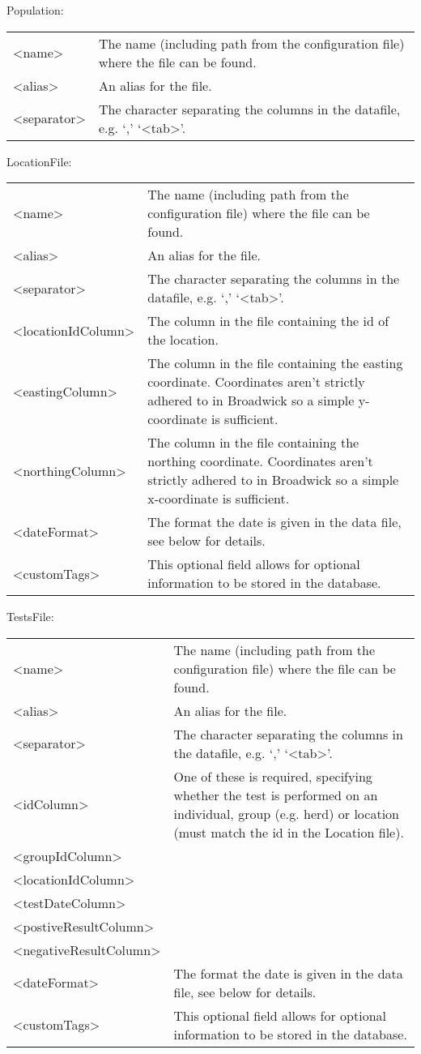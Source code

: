 Population:

\begin{tabulary}{1.0\textwidth}{l p{9cm}}
\toprule
<name> & The name (including path from the configuration file) where the file can be found.\\
<alias> & An alias for the file.\\
<separator> & The character separating the columns in the datafile, e.g. `,' `<tab>'.\\
\bottomrule
\end{tabulary}

LocationFile:

\begin{tabulary}{1.0\textwidth}{l p{9cm}}
\toprule
<name> & The name (including path from the configuration file) where the file can be found.\\
<alias> & An alias for the file.\\
<separator> & The character separating the columns in the datafile, e.g. `,' `<tab>'.\\
<locationIdColumn> & The column in the file containing the id of the location.\\
<eastingColumn> & The column in the file containing the easting coordinate. Coordinates aren’t strictly adhered to in Broadwick so a simple y-coordinate is sufficient.\\
<northingColumn> & The column in the file containing the northing coordinate. Coordinates aren’t strictly adhered to in Broadwick so a simple x-coordinate is sufficient.\\
<dateFormat> & The format the date is given in the data file, see below for details.\\
<customTags> & This optional field allows for optional information to be stored in the database.\\
\bottomrule
\end{tabulary}

TestsFile:

\begin{tabulary}{1.0\textwidth}{l p{10cm}}
\toprule
<name> & The name (including path from the configuration file) where the file can be found.\\
<alias> & An alias for the file.\\
<separator> & The character separating the columns in the datafile, e.g. `,' `<tab>'.\\
<idColumn> & One of these is required, specifying whether the test is performed on an individual, group (e.g. herd) or location (must match the id in the Location file).\\
<groupIdColumn> & \\
<locationIdColumn> & \\
<testDateColumn> & \\
<postiveResultColumn> & \\
<negativeResultColumn> & \\
<dateFormat> & The format the date is given in the data file, see below for details.\\
<customTags> & This optional field allows for optional information to be stored in the database. \\
\bottomrule
\end{tabulary}

